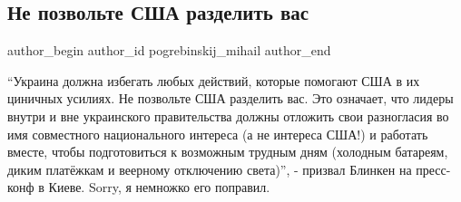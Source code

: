  
 
 
 
 
 
\subsection{Не позвольте США разделить вас}
\label{sec:20_01_2022.fb.pogrebinskij_mihail.1.blinken}
 
\ifcmt
 author_begin
   author_id pogrebinskij_mihail
 author_end
\fi

\enquote{Украина должна избегать любых действий, которые помогают США в их циничных
усилиях. Не позвольте США разделить вас. Это означает, что лидеры внутри и вне
украинского правительства должны отложить свои разногласия во имя совместного
национального интереса (а не интереса США!) и работать вместе, чтобы
подготовиться к возможным трудным дням (холодным батареям, диким платёжкам и
веерному отключению света)}, - призвал Блинкен на пресс-конф в Киеве. Sorry, я
немножко его поправил.

